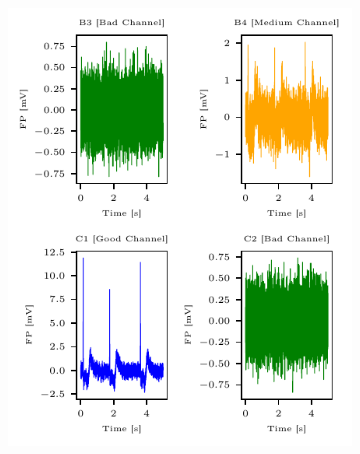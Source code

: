 \documentclass{report}
\begin{document}
    \begin{figure}[H]
                \centering
                 \begin{subfigure}[b]{0.45\textwidth}
                    \includegraphics[width=\textwidth,keepaspectratio]{plots/chapter_3/mea_4_channels_plot.pdf}
                    \caption[MEA channel quality classification]{}
                    \label{fig:mea-channel-categories}
                \end{subfigure}
                ~
                \begin{subfigure}[b]{0.45\textwidth}

\end{subfigure}
\end{figure}
\end{document}
